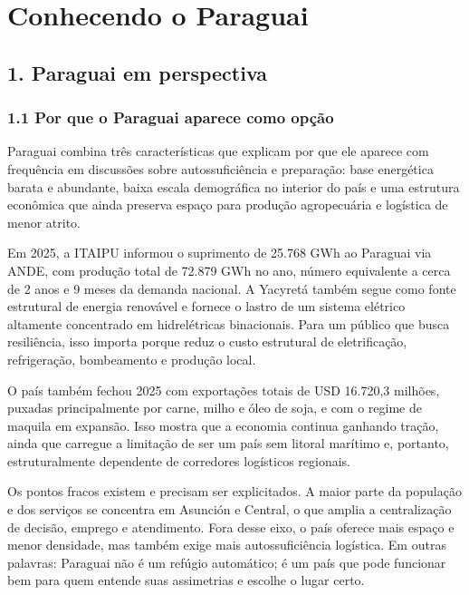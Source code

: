 \chapter{Conhecendo o Paraguai}\label{conhecendo-o-paraguai}

\section{1. Paraguai em perspectiva}\label{paraguai-em-perspectiva}

\subsection{1.1 Por que o Paraguai aparece como
opção}\label{por-que-o-paraguai-aparece-como-opuxe7uxe3o}

Paraguai combina três características que explicam por que ele aparece
com frequência em discussões sobre autossuficiência e preparação: base
energética barata e abundante, baixa escala demográfica no interior do
país e uma estrutura econômica que ainda preserva espaço para produção
agropecuária e logística de menor atrito.

Em 2025, a ITAIPU informou o suprimento de 25.768 GWh ao Paraguai via
ANDE, com produção total de 72.879 GWh no ano, número equivalente a
cerca de 2 anos e 9 meses da demanda nacional. A Yacyretá também segue
como fonte estrutural de energia renovável e fornece o lastro de um
sistema elétrico altamente concentrado em hidrelétricas binacionais.
Para um público que busca resiliência, isso importa porque reduz o custo
estrutural de eletrificação, refrigeração, bombeamento e produção local.

O país também fechou 2025 com exportações totais de USD 16.720,3
milhões, puxadas principalmente por carne, milho e óleo de soja, e com o
regime de maquila em expansão. Isso mostra que a economia continua
ganhando tração, ainda que carregue a limitação de ser um país sem
litoral marítimo e, portanto, estruturalmente dependente de corredores
logísticos regionais.

Os pontos fracos existem e precisam ser explicitados. A maior parte da
população e dos serviços se concentra em Asunción e Central, o que
amplia a centralização de decisão, emprego e atendimento. Fora desse
eixo, o país oferece mais espaço e menor densidade, mas também exige
mais autossuficiência logística. Em outras palavras: Paraguai não é um
refúgio automático; é um país que pode funcionar bem para quem entende
suas assimetrias e escolhe o lugar certo.


